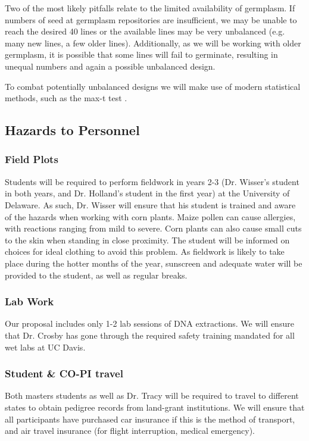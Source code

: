 \documentclass[12pt]{article}
\begin{document}
Two of the most likely pitfalls relate to the limited availability of germplasm. 
If numbers of seed at germplasm repositories are insufficient, we may be unable to reach the desired 40 lines or the available lines may be very unbalanced (e.g. many new lines, a few older lines).
Additionally, as we will be working with older germplasm, it is possible that some lines will fail to germinate, resulting in unequal numbers and again a possible unbalanced design.

To combat potentially unbalanced designs we will make use of modern statistical methods, such as the max-t test \citep{herberich2010robust}. 

\subsection*{Hazards to Personnel}
\subsubsection*{Field Plots}
Students will be required to perform fieldwork in years 2-3 (Dr. Wisser's student in both years, and Dr. Holland's student in the first year) at the University of Delaware. As such, Dr. Wisser will ensure that his student is trained and aware of the hazards when working with corn plants. Maize pollen can cause allergies, with reactions ranging from mild to severe. Corn plants can also cause small cuts to the skin when standing in close proximity. The student will be informed on choices for ideal clothing to avoid this problem. As fieldwork is likely to take place during the hotter months of the year, sunscreen and adequate water will be provided to the student, as well as regular breaks.

\subsubsection*{Lab Work}
Our proposal includes only 1-2 lab sessions of DNA extractions. We will ensure that Dr. Crosby has gone through the required safety training mandated for all wet labs at UC Davis.

\subsubsection*{Student \& CO-PI travel}
Both masters students as well as Dr. Tracy will be required to travel to different states to obtain pedigree records from land-grant institutions. We will ensure that all participants have purchased car insurance if this is the method of transport, and air travel insurance (for flight interruption, medical emergency).
\end{document}
